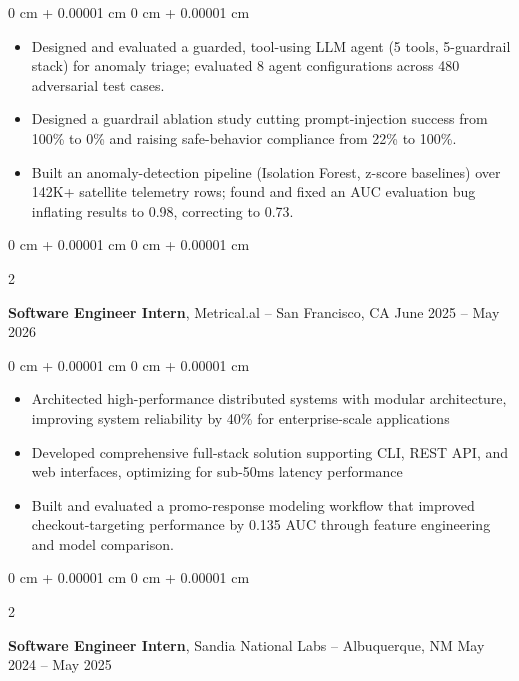 \documentclass[10pt, letterpaper]{article}
\newenvironment{highlights}{
    \begin{itemize}[
        topsep=0.06 cm,
        parsep=0.06 cm,
        partopsep=0pt,
        itemsep=0pt,
        leftmargin=0 cm + 10pt
    ]
}{
    \end{itemize}
}
\newenvironment{onecolentry}{
    \begin{adjustwidth}{
        0 cm + 0.00001 cm
    }{
        0 cm + 0.00001 cm
    }
}{
    \end{adjustwidth}
}
\newenvironment{twocolentry}[2][]{
    \onecolentry
    \def\secondColumn{#2}
    \setcolumnwidth{\fill, 4.5 cm}
    \begin{paracol}{2}
}{
    \switchcolumn \raggedleft \secondColumn
    \end{paracol}
    \endonecolentry
}
\begin{document}
\vspace{0.06 cm}
\begin{onecolentry}
    \begin{highlights}
        \item Designed and evaluated a guarded, tool-using LLM agent (5 tools, 5-guardrail stack) for anomaly triage; evaluated 8 agent configurations across 480 adversarial test cases.
        \item Designed a guardrail ablation study cutting prompt-injection success from 100\% to 0\% and raising safe-behavior compliance from 22\% to 100\%.
        \item Built an anomaly-detection pipeline (Isolation Forest, z-score baselines) over 142K+ satellite telemetry rows; found and fixed an AUC evaluation bug inflating results to 0.98, correcting to 0.73.
    \end{highlights}
\end{onecolentry}

\begin{twocolentry}{
    June 2025 -- May 2026
}
    \textbf{Software Engineer Intern}, Metrical.al -- San Francisco, CA\end{twocolentry}

\vspace{0.06 cm}
\begin{onecolentry}
    \begin{highlights}
        \item Architected high-performance distributed systems with modular architecture, improving system reliability by 40\% for enterprise-scale applications
        \item Developed comprehensive full-stack solution supporting CLI, REST API, and web interfaces, optimizing for sub-50ms latency performance
        \item Built and evaluated a promo-response modeling workflow that improved checkout-targeting performance by 0.135 AUC through feature engineering and model comparison.
    \end{highlights}
\end{onecolentry}

\begin{twocolentry}{
    May 2024 -- May 2025
}
    \textbf{Software Engineer Intern}, Sandia National Labs -- Albuquerque, NM\end{twocolentry}
\end{document}
